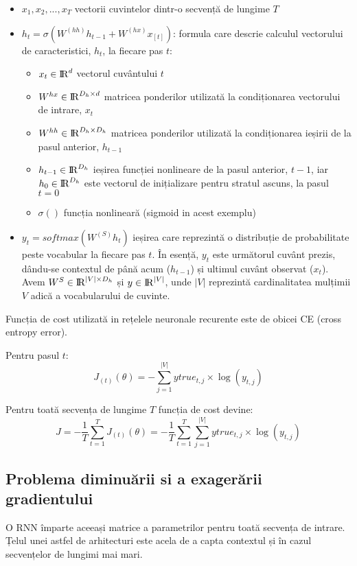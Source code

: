 \begin{itemize}
	\item $x_1, x_2, ..., x_T$ vectorii cuvintelor dintr-o secvență de lungime $T$
	\item $h_t = \sigma{(W^{(hh)} h_{t-1} + W^{(hx)} x_{[t]})}$: formula care descrie calculul vectorului de caracteristici, $h_t$, la fiecare pas $t$:
	
	\begin{itemize}
		\item $ x_t \in {\rm I\!R}^d $ vectorul cuvântului $t$
		\item $ W^{hx} \in {\rm I\!R}^{D_h \times d} $ matricea ponderilor utilizată la condiționarea vectorului de intrare, $x_t$
		\item $ W^{hh} \in {\rm I\!R}^{D_h \times D_h} $ matricea ponderilor utilizată la condiționarea ieșirii de la pasul anterior, $h_{t-1}$
		\item $ h_{t-1} \in  {\rm I\!R}^{D_h} $ ieșirea funcției nonlineare de la pasul anterior, $t-1$, iar $h_0 \in  {\rm I\!R}^{D_h}$ este vectorul de inițializare pentru stratul ascuns, la pasul $t=0$
		\item $ \sigma() $ funcția nonlineară  (sigmoid in acest exemplu)
	\end{itemize}

	\item $ y_t = softmax(W^{(S)} h_t) $ ieșirea care reprezintă o distribuție de probabilitate peste vocabular la fiecare pas $t$. În esență, $y_t$ este următorul cuvânt prezis, dându-se contextul de până  acum ($ h_{t-1} $) și ultimul cuvânt observat ($x_t$). Avem  $ W^{S} \in {\rm I\!R}^{|V| \times D_h} $ și $ y \in {\rm I\!R}^{|V|} $, unde $|V|$ reprezintă cardinalitatea mulțimii $V$ adică a vocabularului de cuvinte.

\end{itemize}

Funcția de cost utilizată in rețelele neuronale recurente este de obicei CE (cross entropy error).

Pentru pasul $t$:
$$
J_{(t)}(\theta) = - \sum_{j=1}^{|V|}  ytrue_{t, j} \times \log(y_{t, j})
$$

Pentru toată secvența de lungime $T$ funcția de cost devine:
$$
J = - \frac{1}{T} \sum_{t=1}^{T} J_{(t)}(\theta) = - \frac{1}{T} \sum_{t=1}^{T}  \sum_{j=1}^{|V|}  ytrue_{t, j} \times \log(y_{t, j})
$$

\cite{cs224d_notes}


\subsection{Problema diminuării si a exagerării gradientului}
O RNN împarte aceeași matrice a parametrilor pentru toată secvența de intrare. Țelul unei astfel de arhitecturi este acela de a capta contextul și în cazul secvențelor de lungimi mai mari.

